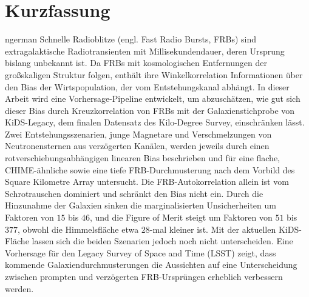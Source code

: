\section*{Kurzfassung}
\begin{foreignlanguage}{ngerman}
Schnelle Radioblitze (engl. Fast Radio Bursts, FRBs) sind extragalaktische Radiotransienten
mit Millisekundendauer, deren Ursprung bislang unbekannt ist. Da FRBs mit
kosmologischen Entfernungen der großskaligen Struktur folgen, enthält ihre Winkelkorrelation
Informationen über den Bias der Wirtspopulation, der vom Entstehungskanal abhängt. In dieser
Arbeit wird eine Vorhersage-Pipeline entwickelt, um abzuschätzen, wie gut sich dieser Bias durch
Kreuzkorrelation von FRBs mit der Galaxienstichprobe von
KiDS-Legacy, dem finalen Datensatz des Kilo-Degree Survey, einschränken lässt. Zwei
Entstehungsszenarien, junge Magnetare und Verschmelzungen von Neutronensternen aus verzögerten Kanälen, werden jeweils
durch einen rotverschiebungsabhängigen linearen Bias beschrieben und für eine flache,
CHIME-ähnliche sowie eine tiefe FRB-Durchmusterung nach dem Vorbild des Square Kilometre Array untersucht.
 Die FRB-Autokorrelation allein
ist vom Schrotrauschen dominiert und schränkt den Bias nicht ein. Durch die Hinzunahme der
Galaxien sinken die marginalisierten Unsicherheiten um Faktoren von $15$ bis $46$, und die
Figure of Merit steigt um Faktoren von $51$ bis $377$, obwohl die Himmelsfläche etwa
$28$-mal kleiner ist. Mit der aktuellen KiDS-Fläche lassen sich die beiden Szenarien jedoch noch nicht
unterscheiden. Eine Vorhersage für den Legacy Survey of Space and Time (LSST) zeigt, dass
kommende Galaxiendurchmusterungen die Aussichten auf eine Unterscheidung zwischen prompten und
verzögerten FRB-Ursprüngen erheblich verbessern werden.
\end{foreignlanguage}